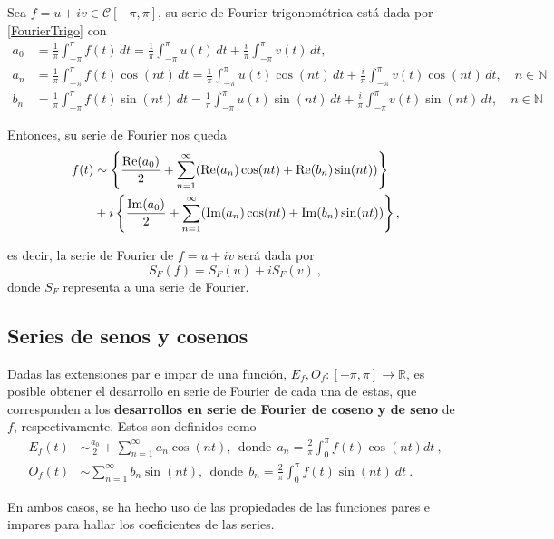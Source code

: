 Sea $f = u + iv \in \mathscr{C}[-\pi,\pi]$, su serie de Fourier trigonométrica está dada por \eqref{FourierTrigo} con 
\begin{align*}
    a_0 &= \frac{1}{\pi} \int_{-\pi}^{\pi} f(t) \,dt =  \frac{1}{\pi} \int_{-\pi}^{\pi} u(t) \,dt + \frac{i}{\pi} \int_{-\pi}^{\pi} v(t) \,dt,\\
    a_n &= \frac{1}{\pi} \int_{-\pi}^{\pi} f(t) \cos(nt) \,dt = \frac{1}{\pi} \int_{-\pi}^{\pi} u(t) \cos(nt) \,dt + \frac{i}{\pi} \int_{-\pi}^{\pi} v(t) \cos(nt) \,dt , \quad n \in \mathbb{N} \\
    b_n &= \frac{1}{\pi} \int_{-\pi}^{\pi} f(t) \sin(nt) \,dt = \frac{1}{\pi} \int_{-\pi}^{\pi} u(t) \sin(nt) \,dt + \frac{i}{\pi} \int_{-\pi}^{\pi} v(t) \sin(nt) \,dt, \quad n \in \mathbb{N}
\end{align*}

Entonces, su serie de Fourier nos queda
\begin{align}
  f(t) & \sim   \left\{ \frac{\operatorname{Re}(a_0)}{2} + \sum_{n=1}^{\infty} ( \operatorname{Re}(a_n) \cos(nt) + \operatorname{Re}(b_n) \sin(nt) ) \right\}  \nonumber \\
   &  + i \left\{ \frac{\operatorname{Im}(a_0)}{2} + \sum_{n=1}^{\infty} (\operatorname{Im}(a_n) \cos(nt) + \operatorname{Im}(b_n) \sin(nt)) \right\},
\end{align}

es decir, la serie de Fourier de $f = u + iv$ será dada por
\begin{equation}
    S_F(f) = S_F(u) + i S_F(v) \ ,
\end{equation}
donde $S_F$ representa a una serie de Fourier.


\subsection{Series de senos y cosenos}

\begin{defi} 
    Dadas las extensiones par e impar de una función, $E_f, O_f: [-\pi,\pi] \to \mathbb{R}$, es posible obtener el desarrollo en serie de Fourier de cada una de estas, que corresponden a los \textbf{desarrollos en serie de Fourier de coseno y de seno} de $f$, respectivamente. Estos son definidos como
    \begin{align*}
        E_f(t) & \sim \frac{a_0}{2}  + \sum_{n=1}^{\infty} a_n \cos(nt), ~~\mbox{donde}~~ a_n = \frac{2}{\pi} \int_0^{\pi} f(t) \cos(nt)  dt \ , \\
        O_f(t) & \sim  \sum_{n=1}^{\infty} b_n \sin(nt), ~~\mbox{donde} ~~ b_n = \frac{2}{\pi} \int_0^{\pi} f(t) \sin (nt) \ dt \ .
    \end{align*}

    En ambos casos, se ha hecho uso de las propiedades de las funciones pares e impares para hallar los coeficientes de las series.
\end{defi}

